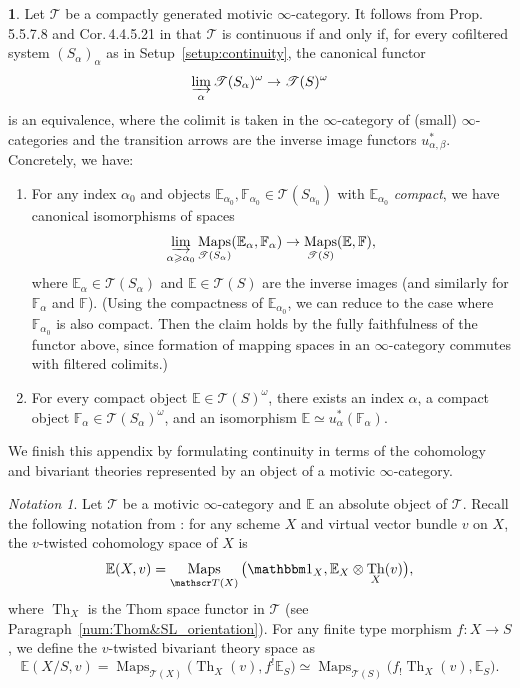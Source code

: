 \documentclass[JEP,XML,SOM,Unicode]{cedram}
\newcommand{\T}{\mathscr T}
\newcommand{\E}{\mathbb E}
\newcommand{\F}{\mathbb F}
\newcommand{\un}{\mathbbm 1}
\DeclareMathOperator{\Maps}{Maps}
\DeclareMathOperator{\ilim}{\varinjlim}
\DeclareMathOperator{\Th}{Th}
\theoremstyle{remark}
\newtheorem{notation}[thm]{Notation}
\theoremstyle{definition}
\newtheorem{num}[thm]{}
\numberwithin{equation}{thm}
\begin{document}
\begin{num}\label{num:continuity compact}
Let $\T$ be a compactly generated motivic $\infty$-category.
It follows from Prop.\,5.5.7.8 and Cor.\,4.4.5.21 in \cite{LurieHTT} that $\T$ is continuous if and only if, for every cofiltered system $(S_\alpha)_\alpha$ as in Setup~\ref{setup:continuity}, the canonical functor
\[
\ilim_\alpha \T(S_\alpha)^\omega \to \T(S)^\omega
\]
is an equivalence, where the colimit is taken in the $\infty$-category of (small) $\infty$-categories and the transition arrows are the inverse image functors $u_{\alpha,\beta}^*$.
Concretely, we have:
\begin{enumerate}
\item\label{item:continuity compact maps}
For any index $\alpha_0$ and objects $\E_{\alpha_0},\F_{\alpha_0} \in \T(S_{\alpha_0})$ with $\E_{\alpha_0}$ \emph{compact}, we have canonical isomorphisms of spaces
\begin{equation*}
\ilim_{\alpha\geqslant\alpha_0} \Maps_{\T(S_\alpha)}(\E_\alpha, \F_\alpha)
\to \Maps_{\T(S)}(\E, \F),
\end{equation*}
where $\E_\alpha \in \T(S_\alpha)$ and $\E \in \T(S)$ are the inverse images (and similarly for $\F_\alpha$ and $\F$).
(Using the compactness of $\E_{\alpha_0}$, we can reduce to the case where $\F_{\alpha_0}$ is also compact.
Then the claim holds by the fully faithfulness of the functor above, since formation of mapping spaces in an $\infty$-category commutes with filtered colimits.)

\item
For every compact object $\E \in \T(S)^\omega$, there exists an index $\alpha$, a compact object $\F_\alpha \in \T(S_\alpha)^\omega$, and an isomorphism $\E \simeq u_\alpha^*(\F_\alpha)$.
\end{enumerate}
\end{num}

We finish this appendix by formulating continuity in terms of the cohomology and bivariant theories represented by an object of a motivic $\infty$-category.

\begin{notation}\label{notation:cohomology+bivariant}
Let $\T$ be a motivic $\infty$-category and $\E$ an absolute object of $\T$.
Recall the following notation from \cite[Def.\,2.2.1]{DJK}: for any scheme $X$ and virtual vector bundle $v$ on $X$, the $v$-twisted cohomology space of $X$ is
\[
\E(X, v) = \Maps_{\T(X)}\big( \un_X, \E_X \otimes \Th_X(v) \big),
\]
where $\Th_X$ is the Thom space functor in $\T$ (see Paragraph~\ref{num:Thom&SL_orientation}).
For any finite type morphism $f : X \to S$, we define the $v$-twisted bivariant theory space as
\[
\E(X/S, v)
= \Maps_{\T(X)}\big( \Th_X(v), f^!\E_S \big)
\simeq \Maps_{\T(S)}\big( f_!\Th_X(v), \E_S \big).
\]
\end{notation}
\end{document}
